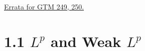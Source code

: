
\newcommand{\norm}[1]{\Vert #1 \Vert}
\newcommand{\norml}[1]{{\left\vert\kern-0.25ex\left\vert\kern-0.25ex\left\vert #1 \right\vert\kern-0.25ex\right\vert\kern-0.25ex\right\vert}}

\href{https://grafakos.missouri.edu/FourierAnalysis.html}{Errata for GTM 249, 250.}

\section*{1.1 $L^p$ and Weak $L^p$}

